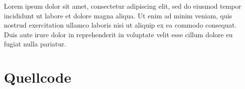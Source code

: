 \documentclass[12pt, a4paper]{article} %
\begin{document}


Lorem ipsum dolor sit amet, consectetur adipiscing elit, sed do eiusmod tempor incididunt ut labore et dolore magna aliqua. Ut enim ad minim veniam, quis nostrud exercitation ullamco laboris nisi ut aliquip ex ea commodo consequat. Duis aute irure dolor in reprehenderit in voluptate velit esse cillum dolore eu fugiat nulla pariatur.


\section{Quellcode}


\end{document}
